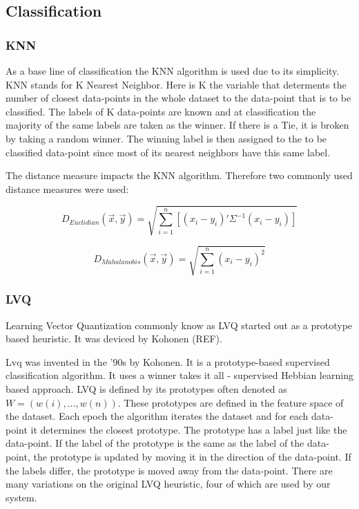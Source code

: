 


\subsection{Classification}


\subsubsection{KNN}
As a base line of classification the KNN algorithm is used due to its simplicity. KNN stands for K Nearest Neighbor. Here is K the variable that determents the number of closest data-points in the whole dataset to the data-point that is to be classified. The labels of K data-points are known and at classification the majority of the same labels are taken as the winner. If there is a Tie, it is broken by taking a random winner. The winning label is then assigned to the to be classified data-point since most of its nearest neighbors have this same label.

The distance measure impacts the KNN algorithm. Therefore two commonly used distance measures were used:

\begin{equation}
D_{Euclidian}(\vec{x},\vec{y}) = \sqrt{\sum^n_{i=1}[(x_i-y_i)'\Sigma^{-1}(x_i-y_i)]} 
\end{equation}

\begin{equation}
D_{Mahalanobis}(\vec{x},\vec{y}) = \sqrt{\sum^n_{i=1}(x_i-y_i)^2} 
\end{equation}



\subsubsection{LVQ}

Learning Vector Quantization commonly know as LVQ started out as a prototype based heuristic. It was deviced by Kohonen (REF).


Lvq was invented in the '90s by Kohonen. It is a prototype-based supervised classification algorithm. It uses a winner takes it all - supervised Hebbian learning based approach. LVQ is defined by its prototypes often denoted as $W = (w(i) , ..., w(n))$. These prototypes are defined in the feature space of the dataset. Each epoch the algorithm iterates the dataset and for each data-point it determines the closest prototype. The prototype has a label just like the data-point. If the label of the prototype is the same as the label of the data-point, the prototype is updated by moving it in the direction of the data-point. If the labels differ, the prototype is moved away from the data-point. There are many variations on the original LVQ heuristic, four of which are used by our system.

